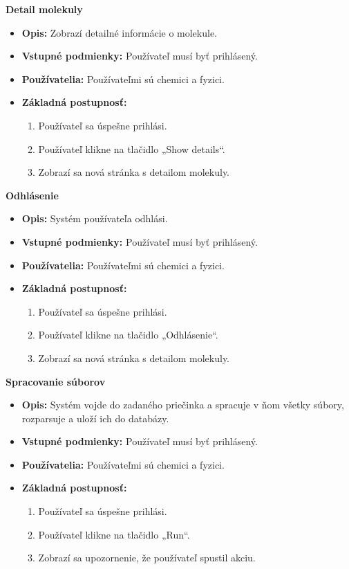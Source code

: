 \documentclass[12pt,a4paper]{article}
\begin{document}
\begin{enumerate}[label={[UC-\arabic*]}]
\begin{itemize}
\begin{enumerate}[label={\arabic*.}]
		\end{enumerate}
	\end{itemize}
	\item {\bf Detail molekuly}
	\begin{itemize}
		\item{\bf Opis: } Zobrazí detailné informácie o molekule.
		\item{\bf Vstupné podmienky: } Používateľ musí byť prihlásený.
		\item{\bf Používatelia: } Používateľmi sú chemici a fyzici.
		\item{\bf Základná postupnosť: }
		\begin{enumerate}[label={\arabic*.}]
			\item Používateľ sa úspešne prihlási.
			\item Používateľ klikne na tlačidlo „Show details“.
			\item Zobrazí sa nová stránka s detailom molekuly.
		\end{enumerate}
	\end{itemize}
	\item {\bf Odhlásenie}
	\begin{itemize}
		\item{\bf Opis: } Systém používateľa odhlási.
		\item{\bf Vstupné podmienky: } Používateľ musí byť prihlásený.
		\item{\bf Používatelia: } Používateľmi sú chemici a fyzici.
		\item{\bf Základná postupnosť: }
		\begin{enumerate}[label={\arabic*.}]
			\item Používateľ sa úspešne prihlási.
			\item Používateľ klikne na tlačidlo „Odhlásenie“.
			\item Zobrazí sa nová stránka s detailom molekuly.
		\end{enumerate}
	\end{itemize}
	\item {\bf Spracovanie súborov}
	\begin{itemize}
		\item{\bf Opis: } Systém vojde do zadaného priečinka a spracuje v ňom všetky súbory, rozparsuje a uloží ich do databázy.
		\item{\bf Vstupné podmienky: } Používateľ musí byť prihlásený.
		\item{\bf Používatelia: } Používateľmi sú chemici a fyzici.
		\item{\bf Základná postupnosť: }
		\begin{enumerate}[label={\arabic*.}]
			\item Používateľ sa úspešne prihlási.
			\item Používateľ klikne na tlačidlo „Run“.
			\item Zobrazí sa upozornenie, že používateľ spustil akciu.
		\end{enumerate}
	\end{itemize}
\end{enumerate}
\end{document}
